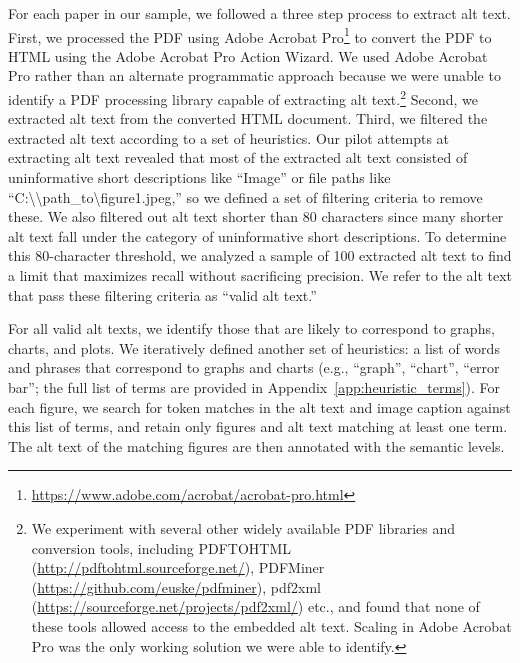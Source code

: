 \documentclass[sigconf]{acmart}
\begin{document}
For each paper in our sample, we followed a three step process to extract alt text. 
First, we processed the PDF using Adobe Acrobat Pro\footnote{\href{https://www.adobe.com/acrobat/acrobat-pro.html}{https://www.adobe.com/acrobat/acrobat-pro.html}} to convert the PDF to HTML using the Adobe Acrobat Pro Action Wizard. We used Adobe Acrobat Pro rather than an alternate programmatic approach because we were unable to identify a PDF processing library capable of extracting alt text.\footnote{We experiment with several other widely available PDF libraries and conversion tools, including PDFTOHTML (\href{http://pdftohtml.sourceforge.net/}{http://pdftohtml.sourceforge.net/}), PDFMiner (\href{https://github.com/euske/pdfminer}{https://github.com/euske/pdfminer}), pdf2xml (\href{https://sourceforge.net/projects/pdf2xml/}{https://sourceforge.net/projects/pdf2xml/}) etc., and found that none of these tools allowed access to the embedded alt text. Scaling in Adobe Acrobat Pro was the only working solution we were able to identify.} Second, we extracted alt text from the converted HTML document. Third, we filtered the extracted alt text according to a set of heuristics. Our pilot attempts at extracting alt text revealed that most of the extracted alt text consisted of uninformative short descriptions like ``Image'' or file paths like ``C:\textbackslash\textbackslash path\_to\textbackslash figure1.jpeg,'' so we defined a set of filtering criteria to remove these. 
We also filtered out alt text shorter than 80 characters since many shorter alt text fall under the category of uninformative short descriptions. To determine this 80-character threshold, we analyzed a sample of 100 extracted alt text to find a limit that maximizes recall without sacrificing precision. We refer to the alt text that pass these filtering criteria as ``valid alt text.'' 



For all valid alt texts, we identify those that are likely to correspond to graphs, charts, and plots. We iteratively defined another set of heuristics: a list of words and phrases that correspond to graphs and charts (e.g., ``graph'', ``chart'', ``error bar''; the full list of terms are provided in Appendix~\ref{app:heuristic_terms}). For each figure, we search for token matches in the alt text and image caption against this list of terms, and retain only figures and alt text matching at least one term. The alt text of the matching figures are then annotated with the \citet{Lundgard2022AccessibleVV} semantic levels.
\end{document}
